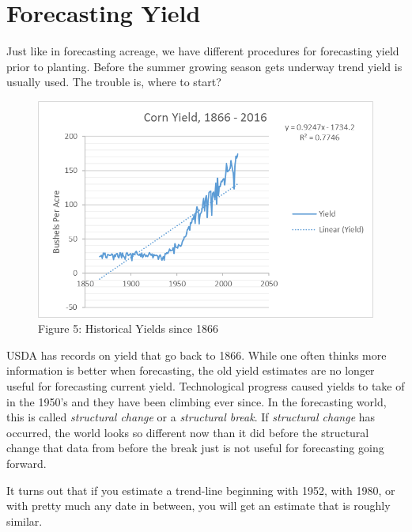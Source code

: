 \documentclass[]{book}
\theoremstyle{definition}
\theoremstyle{definition}
\theoremstyle{remark}
\begin{document}
\section{Forecasting Yield}\label{forecasting-yield}

Just like in forecasting acreage, we have different procedures for
forecasting yield prior to planting. Before the summer growing season
gets underway trend yield is usually used. The trouble is, where to
start?

\begin{figure}[htbp]
\centering
\includegraphics{Excel-files/ForecastingProduction-HistoricalAcreage_files/image005.png}
\caption{Figure 5: Historical Yields since 1866}
\end{figure}

USDA has records on yield that go back to 1866. While one often thinks
more information is better when forecasting, the old yield estimates are
no longer useful for forecasting current yield. Technological progress
caused yields to take of in the 1950's and they have been climbing ever
since. In the forecasting world, this is called \emph{structural change}
or a \emph{structural break}. If \emph{structural change} has occurred,
the world looks so different now than it did before the structural
change that data from before the break just is not useful for
forecasting going forward.

It turns out that if you estimate a trend-line beginning with 1952, with
1980, or with pretty much any date in between, you will get an estimate
that is roughly similar.
\end{document}
